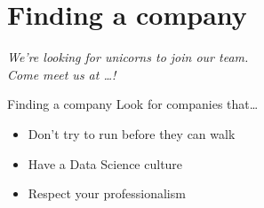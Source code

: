 \section{Finding a company}

\begin{frame}
    \begin{center}
        \Large\it%
        We're looking for unicorns to join our team. \\[\medskipamount]
        Come meet us at \ldots!
    \end{center}
\end{frame}

{
\begin{frame}
\end{frame}}

\begin{frame}{Finding a company}
    \large%
    Look for companies that\ldots
    \begin{itemize}
        \setlength{\itemsep}{\medskipamount}
        \item Don't try to run before they can walk
        \item Have a Data Science culture
        \item Respect your professionalism
    \end{itemize}
\end{frame}

